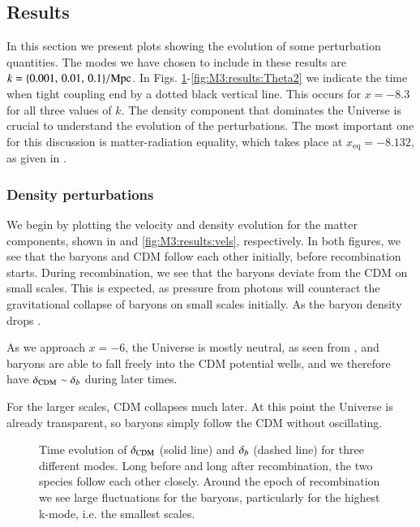 \subsection{Results}\label{ssec:M3:results}
In this section we present plots showing the evolution of some perturbation quantities. The modes we have chosen to include in these results are $k=\{ 0.001,\,0.01,\,0.1 \}/\mathrm{Mpc}$.
In Figs. \ref{fig:M3:results:deltas}-\ref{fig:M3:results:Theta2} we indicate the time when tight coupling end by a dotted black vertical line. This occurs for $x=-8.3$ for all three values of $k$. The density component that dominates the Universe is crucial to understand the evolution of the perturbations. The most important one for this discussion is matter-radiation equality, which takes place at $x_\mathrm{eq}=-8.132$, as given in .    

\subsubsection{Density perturbations} \label{sssec:M3:results:matter_perturbations}
We begin by plotting the velocity and density evolution for the matter components, shown in  and \ref{fig:M3:results:vels}, respectively. In both figures, we see that the baryons and CDM follow each other initially, before recombination starts. During recombination, we see that the baryons deviate from the CDM on small scales. This is expected, as pressure from photons will counteract the gravitational collapse of baryons on small scales initially. As the baryon density drops . 

As we approach $x=-6$, the Universe is mostly neutral, as seen from , and baryons are able to fall freely into the CDM potential wells, and we therefore have $\delta_\mathrm{CDM}\sim\delta_b$ during later times. 

For the larger scales, CDM collapses much later. At this point the Universe is already transparent, so baryons simply follow the CDM without oscillating. 
\begin{figure}[ht!]
    \caption{Time evolution of $\delta_\mathrm{CDM}$ (solid line) and $\delta_b$ (dashed line) for three different modes. Long before and long after recombination, the two species follow each other closely. Around the epoch of recombination we see large fluctuations for the baryons, particularly for the highest k-mode, i.e. the smallest scales.}
    \label{fig:M3:results:deltas}
\end{figure}

